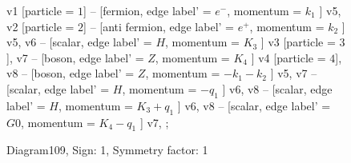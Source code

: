 \documentclass{revtex4}
\begin{document}
\begin{figure}[!htb]
\begin{center}
{    %
v1 [particle = \(1\)] -- [fermion, edge label' = \(e^{-}\), momentum = \(k_{1}\) ] v5, 
v2 [particle = \(2\)] -- [anti fermion, edge label' = \(e^{+}\), momentum = \(k_{2}\) ] v5, 
v6 -- [scalar, edge label' = \(H\), momentum = \(K_{3}\) ] v3 [particle = \(3\)], 
v7 -- [boson, edge label' = \(Z\), momentum = \(K_{4}\) ] v4 [particle = \(4\)], 
v8 -- [boson, edge label' = \(Z\), momentum = \(-k_{1} - k_{2}\) ] v5, 
v7 -- [scalar, edge label' = \(H\), momentum = \(-q_{1}\) ] v6, 
v8 -- [scalar, edge label' = \(H\), momentum = \(K_{3} + q_{1}\) ] v6, 
v8 -- [scalar, edge label' = \(G0\), momentum = \(K_{4} - q_{1}\) ] v7, 
};
\end{center}
\caption{Diagram109, Sign: 1, Symmetry factor: 1}
\end{figure}
\newpage
\end{document}
